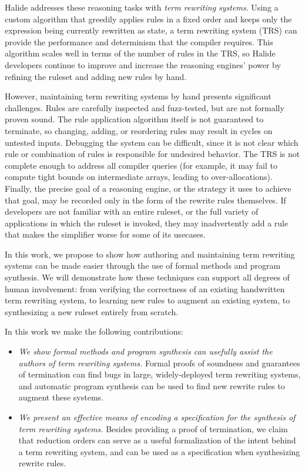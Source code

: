 Halide addresses these reasoning tasks with \emph{term rewriting systems}. Using a custom algorithm 
that greedily applies rules in a fixed order and keeps only the expression being currently 
rewritten as state, a term rewriting system (TRS) can provide the performance and determinism 
that the compiler requires. This algorithm scales well in terms of the number of rules
in the TRS, so Halide developers continue to improve and increase the reasoning engines'
power by refining the ruleset and adding new rules by hand.

However, maintaining term rewriting systems by hand presents significant challenges. Rules are 
carefully inspected and fuzz-tested, but are not formally proven sound. The 
rule application algorithm itself is not guaranteed to terminate, so changing, adding, or 
reordering rules may result in cycles on untested inputs. Debugging the system can be 
difficult, since it is not clear which rule or combination of rules is responsible for 
undesired behavior. The TRS is not complete enough to address all compiler queries 
(for example, it may fail to compute tight bounds on intermediate arrays, leading to over-allocations).
Finally, the precise goal of a reasoning engine, or the strategy it uses to achieve that goal,
may be recorded only in the form of the rewrite rules themselves. If developers are not familiar with 
an entire ruleset, or the full variety of applications in which the ruleset is invoked, they may inadvertently 
add a rule that makes the simplifier worse for some of its usecases.

In this work, we propose to show how authoring and maintaining term rewriting systems can be made easier through the use of formal methods and program synthesis. We will demonstrate how these techniques can support all degrees of human involvement: from verifying the correctness of an existing handwritten term rewriting system, to learning new rules to augment an existing system, to synthesizing a new ruleset entirely from scratch.

In this work we make the following contributions:

\begin{itemize}
    \item \emph{We show formal methods and program synthesis can usefully assist the authors of term rewriting systems.} Formal proofs of soundness and guarantees of termination can find bugs in large, widely-deployed term rewriting systems, and automatic program synthesis can be used to find new rewrite rules to augment these systems.
    \item \emph{We present an effective means of encoding a specification for the synthesis of term rewriting systems.} Besides providing a proof of termination, we claim that reduction orders can serve as a useful formalization of the intent behind a term rewriting system, and can be used as a specification when synthesizing rewrite rules.
\end{itemize}


